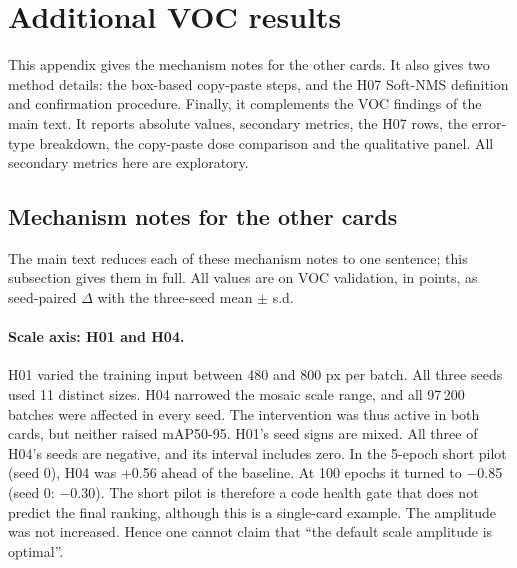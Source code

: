 \setcounter{table}{0}\setcounter{figure}{0}
\section{Additional VOC results}\label{sec:ek-voc}

This appendix gives the mechanism notes for the other cards. It also gives two method details: the box-based copy-paste steps, and the H07 Soft-NMS definition and confirmation procedure. Finally, it complements the VOC findings of the main text. It reports absolute values, secondary metrics, the H07 rows, the error-type breakdown, the copy-paste dose comparison and the qualitative panel. All secondary metrics here are exploratory.

\subsection{Mechanism notes for the other cards}\label{sec:ek-mekanizma}
The main text reduces each of these mechanism notes to one sentence; this subsection gives them in full. All values are on VOC validation, in points, as seed-paired $\Delta$ with the three-seed mean $\pm$ s.d.

\paragraph{Scale axis: H01 and H04.}
H01 varied the training input between 480 and 800 px per batch. All three seeds used 11 distinct sizes. H04 narrowed the mosaic scale range, and all 97\,200 batches were affected in every seed. The intervention was thus active in both cards, but neither raised mAP50-95. H01's seed signs are mixed. All three of H04's seeds are negative, and its interval includes zero. In the 5-epoch short pilot (seed 0), H04 was +0.56 ahead of the baseline. At 100 epochs it turned to $-$0.85 (seed 0: $-$0.30). The short pilot is therefore a code health gate that does not predict the final ranking, although this is a single-card example. The amplitude was not increased. Hence one cannot claim that ``the default scale amplitude is optimal''.

